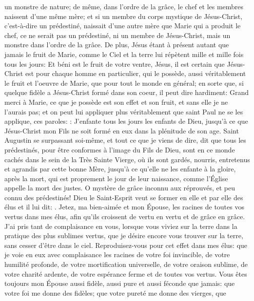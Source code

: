 un monstre de nature; de même, dans l'ordre de la grâce, le chef et les membres naissent d'une même mère; et si
un membre du corps mystique de Jésus-Christ, c'est-à-dire un prédestiné, naissait d'une autre mère que Marie qui
a produit le chef, ce ne serait pas un prédestiné, ni un membre de Jésus-Christ, mais un monstre dans l'ordre de la
grâce.
 De plus, Jésus étant à présent autant que jamais le fruit de Marie, comme le Ciel et la terre lui répètent mille et
mille fois tous les jours: Et béni est le fruit de votre ventre, Jésus, il est certain que Jésus-Christ est pour chaque
homme en particulier, qui le possède, aussi véritablement le fruit et l'oeuvre de Marie, que pour tout le monde en
général; en sorte que, si quelque fidèle a Jésus-Christ formé dans son coeur, il peut dire hardiment: Grand merci à
Marie, ce que je possède est son effet et son fruit, et sans elle je ne l'aurais pas; et on peut lui appliquer plus
véritablement que saint Paul ne se les applique, ces paroles: : J'enfante tous les jours les enfants de Dieu, jusqu'à ce que Jésus-Christ mon Fils ne soit formé en eux
dans la plénitude de son age. Saint Augustin se surpassant soi-même, et tout ce que je viens de dire, dit que tous
les prédestinés, pour être conformes à l'image du Fils de Dieu, sont en ce monde cachés dans le sein de la Très
Sainte Vierge, où ils sont gardés, nourris, entretenus et agrandis par cette bonne Mère, jusqu'à ce qu'elle ne les
enfante à la gloire, après la mort, qui est proprement le jour de leur naissance, comme l'Église appelle la mort des
justes. O mystère de grâce inconnu aux réprouvés, et peu connu des prédestinés!
 Dieu le Saint-Esprit veut se former en elle et par elle des élus et il lui dit: . Jetez,
ma bien-aimée et mon Épouse, les racines de toutes vos vertus dans mes élus, afin qu'ils croissent de vertu en
vertu et de grâce en grâce. J'ai pris tant de complaisance en vous, lorsque vous viviez sur la terre dans la pratique
des plus sublimes vertus, que je désire encore vous trouver sur la terre, sans cesser d'être dans le ciel.
Reproduisez-vous pour cet effet dans mes élus: que je voie en eux avec complaisance les racines de votre foi
invincible, de votre humilité profonde, de votre mortification universelle, de votre oraison sublime, de votre charité
ardente, de votre espérance ferme et de toutes vos vertus. Vous êtes toujours mon Épouse aussi fidèle, aussi pure
et aussi féconde que jamais: que votre foi me donne des fidèles; que votre pureté me donne des vierges, que
